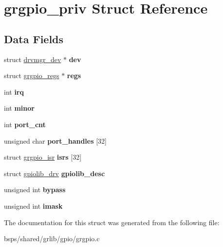 \hypertarget{structgrgpio__priv}{}\section{grgpio\+\_\+priv Struct Reference}
\label{structgrgpio__priv}
\subsection*{Data Fields}
\begin{DoxyCompactItemize}
\item 
\mbox{\label{structgrgpio__priv_a4d3f091cf5e14e3a7315b40c4cc00d68}} 
struct \mbox{\hyperlink{structdrvmgr__dev}{drvmgr\+\_\+dev}} $\ast$ {\bfseries dev}
\item 
\mbox{\label{structgrgpio__priv_aa510003da04dd9550f8c0372e5fb6641}} 
struct \mbox{\hyperlink{structgrgpio__regs}{grgpio\+\_\+regs}} $\ast$ {\bfseries regs}
\item 
\mbox{\label{structgrgpio__priv_a19e20764f34158be5030edd0c3fd418e}} 
int {\bfseries irq}
\item 
\mbox{\label{structgrgpio__priv_a46120e1762254c59589a7e0f63ff56a5}} 
int {\bfseries minor}
\item 
\mbox{\label{structgrgpio__priv_a6d545c99c393d6a158b861fd5884d788}} 
int {\bfseries port\+\_\+cnt}
\item 
\mbox{\label{structgrgpio__priv_abed772204df615e3e47dcdfdbb3b6305}} 
unsigned char {\bfseries port\+\_\+handles} \mbox{[}32\mbox{]}
\item 
\mbox{\label{structgrgpio__priv_ab60a222515d63ea2887f341ab8b43ff0}} 
struct \mbox{\hyperlink{structgrgpio__isr}{grgpio\+\_\+isr}} {\bfseries isrs} \mbox{[}32\mbox{]}
\item 
\mbox{\label{structgrgpio__priv_a23f13c95945849fade69a9477f9b1919}} 
struct \mbox{\hyperlink{structgpiolib__drv}{gpiolib\+\_\+drv}} {\bfseries gpiolib\+\_\+desc}
\item 
\mbox{\label{structgrgpio__priv_a6a99884622a5e1f856838c9ae42a2cba}} 
unsigned int {\bfseries bypass}
\item 
\mbox{\label{structgrgpio__priv_a01dc914977fa908bbceef31aace22514}} 
unsigned int {\bfseries imask}
\end{DoxyCompactItemize}


The documentation for this struct was generated from the following file\+:\begin{DoxyCompactItemize}
\item 
bsps/shared/grlib/gpio/grgpio.\+c\end{DoxyCompactItemize}
